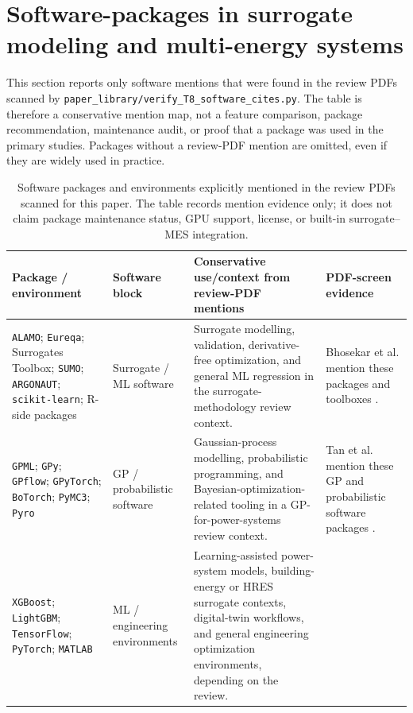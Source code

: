 \section{Software-packages in surrogate modeling and multi-energy systems}
\label{sec:software}

This section reports only software mentions that were found in the review PDFs
scanned by \texttt{paper\_library/verify\_T8\_software\_cites.py}. The table is
therefore a conservative mention map, not a feature comparison, package
recommendation, maintenance audit, or proof that a package was used in the
primary studies. Packages without a review-PDF mention are omitted, even if
they are widely used in practice.

\begin{table}[!t]
\centering
\scriptsize
\caption{Software packages and environments explicitly mentioned in the review PDFs scanned for this paper. The table records mention evidence only; it does not claim package maintenance status, GPU support, license, or built-in surrogate--MES integration.}
\label{tab:T8-software-packages}
\renewcommand{\arraystretch}{1.10}
\begin{tabularx}{\textwidth}{@{}L{0.20\textwidth} L{0.18\textwidth} L{0.34\textwidth} L{0.20\textwidth}@{}}
\toprule
Package / environment & Software block & Conservative use/context from review-PDF mentions & PDF-screen evidence \\
\midrule
\texttt{ALAMO}; \texttt{Eureqa}; Surrogates Toolbox; \texttt{SUMO}; \texttt{ARGONAUT}; \texttt{scikit-learn}; R-side packages &
Surrogate / ML software &
Surrogate modelling, validation, derivative-free optimization, and general ML regression in the surrogate-methodology review context. &
Bhosekar et al. mention these packages and toolboxes \cite{Bhosekar2018}. \\
\texttt{GPML}; \texttt{GPy}; \texttt{GPflow}; \texttt{GPyTorch}; \texttt{BoTorch}; \texttt{PyMC3}; \texttt{Pyro} &
GP / probabilistic software &
Gaussian-process modelling, probabilistic programming, and Bayesian-optimization-related tooling in a GP-for-power-systems review context. &
Tan et al. mention these GP and probabilistic software packages \cite{Tan2026}. \\
\texttt{XGBoost}; \texttt{LightGBM}; \texttt{TensorFlow}; \texttt{PyTorch}; \texttt{MATLAB} &
ML / engineering environments &
Learning-assisted power-system models, building-energy or HRES surrogate contexts, digital-twin workflows, and general engineering optimization environments, depending on the review. &

\end{tabularx}
\end{table}
